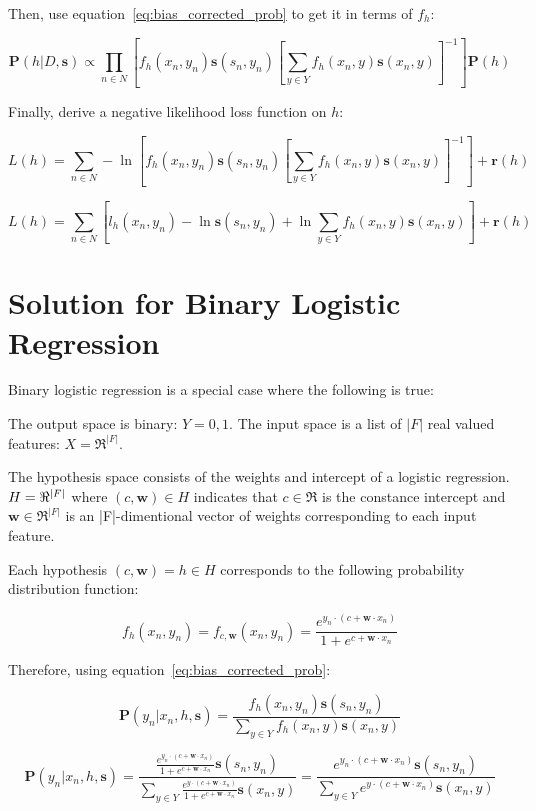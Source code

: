\documentclass[twoside]{article}
\begin{document}
Then, use equation~\eqref{eq:bias_corrected_prob} to get it in terms of \(f_h\):

\[\mathbf{P}(h|D,\mathbf{s})\propto\prod_{n \in N} \left[f_h(x_n,y_n)\mathbf{s}(s_n,y_n)\left [\sum_{y \in Y}f_h(x_n,y)\mathbf{s}(x_n,y) \right ]^{-1} \right]\mathbf{P}(h)\]

Finally, derive a negative likelihood loss function on \(h\):

\[L(h)= \sum_{n \in N} -\ln\left[f_h(x_n,y_n)\mathbf{s}(s_n,y_n)\left [\sum_{y \in Y}f_h(x_n,y)\mathbf{s}(x_n,y) \right ]^{-1} \right] +\mathbf{r}(h)\]

\[L(h)= \sum_{n \in N} \left[l_h(x_n,y_n)-\ln\mathbf{s}(s_n,y_n)+\ln\sum_{y \in Y}f_h(x_n,y)\mathbf{s}(x_n,y) \right] +\mathbf{r}(h)\]

\section{Solution for Binary Logistic Regression}

Binary logistic regression is a special case where the following is true:

The output space is binary: \(Y = {0, 1}\).
The input space is a list of \(|F|\) real valued features: \(X = \Re ^{|F|}\).

The hypothesis space consists of the weights and intercept of a logistic regression. \(H=\Re \time \Re ^{|F|}\)  where  \((c, \mathbf{w}) \in H\) indicates that \(c \in \Re\) is the constance intercept and \(\mathbf{w} \in \Re ^{|F|}\) is an |F|-dimentional vector of weights corresponding to each input feature.

Each hypothesis \((c, \mathbf{w})=h \in H\) corresponds to the following probability distribution function:

\[f_h(x_n, y_n)=f_{c,\mathbf{w}}(x_n, y_n)=\frac{e^{y_n \cdot (c+\mathbf{w} \cdot x_n)}}{1+e^{c+\mathbf{w} \cdot x_n}}\]

Therefore, using  equation~\eqref{eq:bias_corrected_prob}:

\[\mathbf{P}(y_n|x_n,h,\mathbf{s})=\frac{f_h(x_n,y_n)\mathbf{s}(s_n,y_n)}{\sum_{y \in Y}f_h(x_n,y)\mathbf{s}(x_n,y)} \]

\[\mathbf{P}(y_n|x_n,h,\mathbf{s})=\frac{\frac{e^{y_n \cdot(c+\mathbf{w} \cdot x_n)}}{1+e^{c+\mathbf{w} \cdot x_n}}\mathbf{s}(s_n,y_n)}{\sum_{y \in Y}\frac{e^{y \cdot (c+\mathbf{w} \cdot x_n)}}{1+e^{c+\mathbf{w} \cdot x_n}}\mathbf{s}(x_n,y)} =\frac{e^{y_n \cdot (c+\mathbf{w} \cdot x_n)}\mathbf{s}(s_n,y_n)}{\sum_{y \in Y}e^{y \cdot (c+\mathbf{w} \cdot x_n)}\mathbf{s}(x_n,y)}\]
\end{document}
